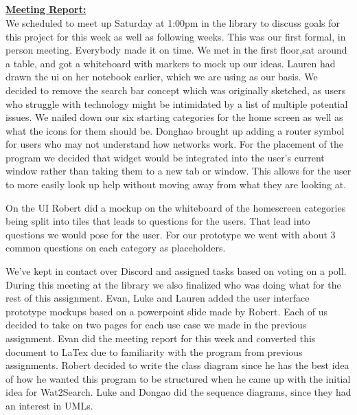 \documentclass[12pt, letterpaper]{article}
\begin{document}
\\\\\\\\\\\\\\\\
\\\underline{\textbf{Meeting Report:}}
\\We scheduled to meet up Saturday at 1:00pm in the library to discuss goals for this project for this week as well as following weeks. This was our first formal, in person meeting. Everybody made it on time. We met in the first floor,sat around a table, and got a whiteboard with markers to mock up our ideas. Lauren had drawn the ui on her notebook earlier, which we are using as our basis. We decided to remove the search bar concept which was originally sketched, as users who struggle with technology might be intimidated by a list of multiple potential issues. We nailed down our six starting categories for the home screen as well as what the icons for them should be. Donghao brought up adding a router symbol for users who may not understand how networks work. For the placement of the program we decided that widget would be integrated into the user’s current window rather than taking them to a new tab or window. This allows for the user to more easily look up help without moving away from what they are looking at.

On the UI Robert did a mockup on the whiteboard of the homescreen categories being split into tiles that leads to questions for the users. That lead into questions we would pose for the user. For our prototype we went with about 3 common questions on each category as placeholders. 

We’ve kept in contact over Discord and assigned tasks based on voting on a poll. During this meeting at the library we also finalized who was doing what for the rest of this assignment.  Evan, Luke and Lauren added the user interface prototype mockups based on a powerpoint slide made by Robert. Each of us decided to take on two pages for each use case we made in the previous assignment. Evan did the meeting report for this week and converted this document to LaTex due to familiarity with the program from previous assignments.  Robert decided to write the class diagram since he has the best idea of how he wanted this program to be structured when he came up with the initial idea for Wat2Search. Luke and Dongao did the sequence diagrams, since they had an interest in UMLs.
\end{document}
